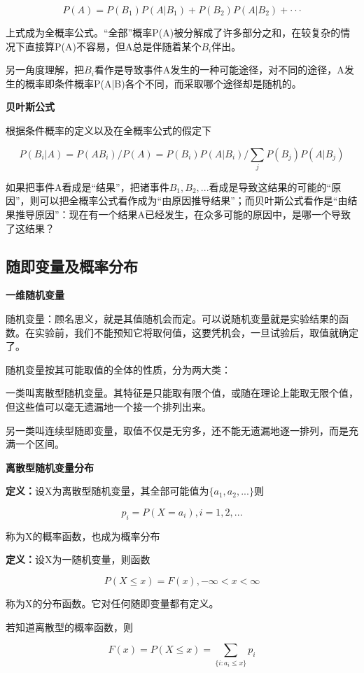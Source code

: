 \documentclass{ctexart}
\begin{document}
	\[P(A)=P(B_1)P(A|B_1)+P(B_2)P(A|B_2)+···\]
	
	上式成为全概率公式。“全部”概率P(A)被分解成了许多部分之和，在较复杂的情况下直接算P(A)不容易，但A总是伴随着某个\(B_i\)伴出。
	
	另一角度理解，把\(B_i\)看作是导致事件A发生的一种可能途径，对不同的途径，A发生的概率即条件概率P(A|B)各个不同，而采取哪个途径却是随机的。
	
	\mbox{}
	
	\textbf{贝叶斯公式}
	
	根据条件概率的定义以及在全概率公式的假定下
	
	\[P(B_i|A)=P(AB_i)/P(A)=P(B_i)P(A|B_i)/\sum_{j}P(B_j)P(A|B_j)\]
	
	如果把事件A看成是“结果”，把诸事件\(B_1,B_2,...\)看成是导致这结果的可能的“原因”，则可以把全概率公式看作成为“由原因推导结果”；而贝叶斯公式看作是“由结果推导原因”：现在有一个结果A已经发生，在众多可能的原因中，是哪一个导致了这结果？
	
	\subsection{随即变量及概率分布}
	
	\textbf{一维随机变量}
	
	随机变量：顾名思义，就是其值随机会而定。可以说随机变量就是实验结果的函数。在实验前，我们不能预知它将取何值，这要凭机会，一旦试验后，取值就确定了。
	
	随机变量按其可能取值的全体的性质，分为两大类：
	
	一类叫离散型随机变量。其特征是只能取有限个值，或随在理论上能取无限个值，但这些值可以毫无遗漏地一个接一个排列出来。
	
	另一类叫连续型随即变量，取值不仅是无穷多，还不能无遗漏地逐一排列，而是充满一个区间。
	
	\mbox{}
	
	\textbf{离散型随机变量分布}
	
	\textbf{定义：}设X为离散型随机变量，其全部可能值为\(\{a_1,a_2,...\}\)则
	
	\[p_i=P(X=a_i), i =1,2,...\]
	
	称为X的概率函数，也成为概率分布
	
	\textbf{定义：}设X为一随机变量，则函数
	
	\[P(X \leq x)=F(x), -\infty < x < \infty\]
	
	称为X的分布函数。它对任何随即变量都有定义。
	
	若知道离散型的概率函数，则
	
	\[F(x)=P(X \leq x)=\sum_{\{i:a_i \leq x\}}p_i\]
	
\end{document}
